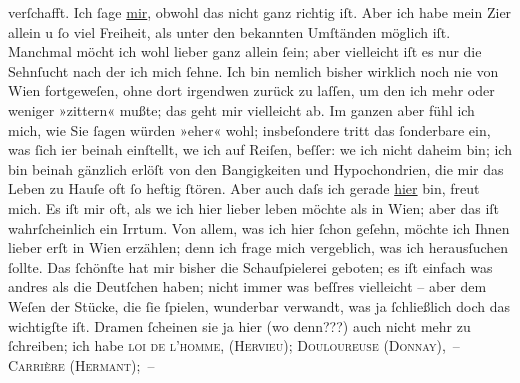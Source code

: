\begin{ledgroupsized}[t]{13cm}
               verſchafft. Ich ſage \uline{mir}, obwohl das nicht ganz richtig iſt. Aber ich habe
               mein Zi{\geminationm}er allein u ſo viel Freiheit, als unter den
               bekannten Umſtänden möglich iſt. Manchmal möcht ich wohl lieber ganz allein ſein;
               aber vielleicht iſt {\pb}es nur die Sehnſucht nach der ich
               mich ſehne. Ich bin nemlich bisher wirklich noch nie von Wien fortgeweſen, ohne dort irgendwen zurück zu laſſen, um den
               ich mehr oder weniger »zittern« mußte; das geht mir vielleicht ab. Im ganzen aber
               fühl ich mich, wie Sie ſagen würden »eher« wohl; insbeſondere tritt das ſonderbare
               ein, was ſich i{\geminationm}er beinah einſtellt, we{\geminationn} ich auf Reiſen, beſſer: we{\geminationn} ich nicht daheim bin; ich bin beinah gänzlich erlöſt von den Bangigkeiten und
               Hypochondrien, die mir das Leben zu Hauſe oft ſo heftig ſtören. Aber \introOben{}auch\introOben{} daſs ich gerade \uline{hier} bin,
               freut mich. Es iſt mir oft, als we{\geminationn} ich hier lieber
               leben möchte als in Wien; aber das iſt
                  wahrſchein{\pb}lich ein Irrtum. Von allem, was ich hier
               ſchon geſehn, möchte ich Ihnen lieber erſt in Wien
               erzählen; denn ich frage mich vergeblich, was ich herausſuchen ſollte. Das ſchönſte
               hat mir bisher die Schauſpielerei geboten; es iſt einfach was andres als die
               Deutſchen haben; nicht immer was beſſres vielleicht – aber dem Weſen der Stücke, die
               ſie ſpielen, wunderbar verwandt, was ja ſchließlich doch das wichtigſte iſt. Dramen
               ſcheinen sie ja hier (wo denn???) auch nicht mehr zu ſchreiben; ich habe \textsc{loi de l’homme, (Hervieu); Douloureuse
                     (Donnay), – Carrière (Hermant); –
}
\end{ledgroupsized}
